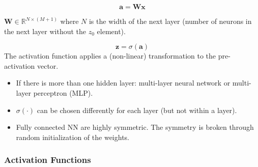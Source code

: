\begin{equation*}
    \mathbf{a} = \mathbf{W} \mathbf{x}
\end{equation*}

$\mathbf{W} \in \mathbb{R}^{N\times (M+1)}$ where $N$ is the width of the next layer (number of neurons in the next layer without the $z_0$ element).

\newpar{}
\begin{equation*}
    \mathbf{z} = \sigma(\mathbf{a})
\end{equation*}
The activation function applies a (non-linear) transformation to the pre-activation vector.

\newpar{}
\begin{itemize}
    \item If there is more than one hidden layer: multi-layer neural network or multi-layer perceptron (MLP).
    \item $\sigma(\cdot)$ can be chosen differently for each layer (but not within a layer).
    \item Fully connected NN are highly symmetric. The symmetry is broken through random initialization of the weights.
\end{itemize}


\subsubsection{Activation Functions}

\renewcommand{\arraystretch}{1.3}
\setlength{\oldtabcolsep}{\tabcolsep}\setlength\tabcolsep{6pt}

